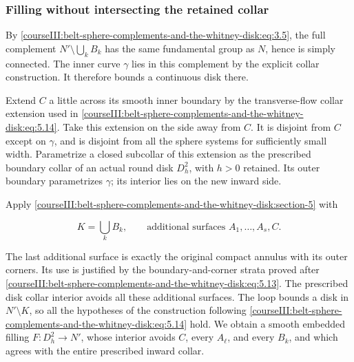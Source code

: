 \subsubsection{Filling without intersecting the retained collar}
\label{courseIII:belt-sphere-complements-and-the-whitney-disk:whitney-filled-collar}

\label{courseIII:belt-sphere-complements-and-the-whitney-disk:section-7.3}

By \eqref{courseIII:belt-sphere-complements-and-the-whitney-disk:eq:3.5}, the full complement \(N'\setminus\bigcup_kB_k\) has the same fundamental group as \(N\), hence is simply connected. The inner curve \(\gamma\) lies in this complement by the explicit collar construction. It therefore bounds a continuous disk there.

Extend \(C\) a little across its smooth inner boundary by the transverse-flow collar extension used in \eqref{courseIII:belt-sphere-complements-and-the-whitney-disk:eq:5.14}. Take this extension on the side away from \(C\). It is disjoint from \(C\) except on \(\gamma\), and is disjoint from all the sphere systems for sufficiently small width. Parametrize a closed subcollar of this extension as the prescribed boundary collar of an actual round disk \(D_h^2\), with \(h>0\) retained. Its outer boundary parametrizes \(\gamma\); its interior lies on the new inward side.

Apply \cref{courseIII:belt-sphere-complements-and-the-whitney-disk:section-5} with

\begin{equation}
K=\bigcup_k B_k,\qquad
\text{additional surfaces } A_1,\ldots,A_s,C.
\label{courseIII:belt-sphere-complements-and-the-whitney-disk:eq:7.8}
\end{equation}

The last additional surface is exactly the original compact annulus with its outer corners. Its use is justified by the boundary-and-corner strata proved after \eqref{courseIII:belt-sphere-complements-and-the-whitney-disk:eq:5.13}. The prescribed disk collar interior avoids all these additional surfaces. The loop bounds a disk in \(N'\setminus K\), so all the hypotheses of the construction following \eqref{courseIII:belt-sphere-complements-and-the-whitney-disk:eq:5.14} hold. We obtain a smooth embedded filling \(F:D_h^2\to N'\), whose interior avoids \(C\), every \(A_\ell\), and every \(B_k\), and which agrees with the entire prescribed inward collar.

